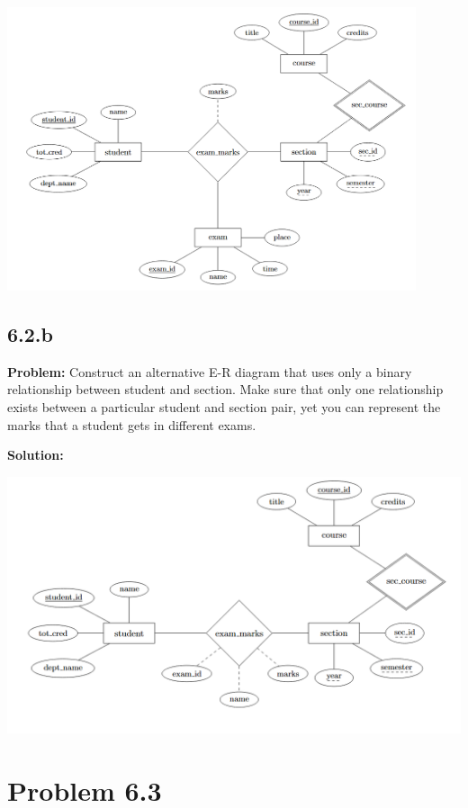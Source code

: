 \documentclass[12pt,a4paper]{article}
\begin{document}
\begin{center}
\includegraphics[width=0.9\textwidth]{6.2.a.png}
\end{center}

\subsection*{6.2.b}

\textbf{Problem:} Construct an alternative E-R diagram that uses only a binary relationship between student and section. Make sure that only one relationship exists between a particular student and section pair, yet you can represent the marks that a student gets in different exams.

\textbf{Solution:}

\begin{center}
\includegraphics[width=1\textwidth]{6.2.b.png}
\end{center}

\section*{Problem 6.3}
\end{document}
